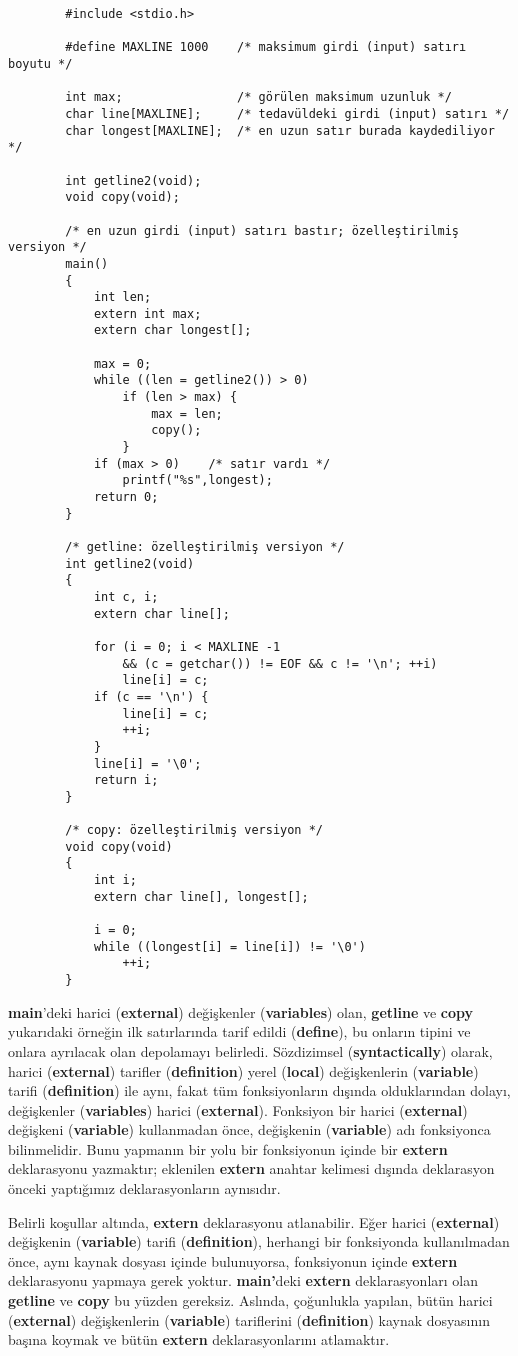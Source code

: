 \documentclass[a4paper,12pt,oneside]{book}
\begin{document}
\begin{lstlisting}
		#include <stdio.h>

		#define MAXLINE 1000	/* maksimum girdi (input) satırı boyutu */

		int max;				/* görülen maksimum uzunluk */
		char line[MAXLINE];     /* tedavüldeki girdi (input) satırı */
		char longest[MAXLINE];  /* en uzun satır burada kaydediliyor */

		int getline2(void);
		void copy(void);

		/* en uzun girdi (input) satırı bastır; özelleştirilmiş versiyon */
		main()
		{
			int len;
			extern int max;
			extern char longest[];

			max = 0;
			while ((len = getline2()) > 0)
				if (len > max) {
					max = len;
					copy();
				}
			if (max > 0)	/* satır vardı */
				printf("%s",longest);
			return 0;
		}

		/* getline: özelleştirilmiş versiyon */
		int getline2(void)
		{
			int c, i;
			extern char line[];

			for (i = 0; i < MAXLINE -1
				&& (c = getchar()) != EOF && c != '\n'; ++i)
				line[i] = c;
			if (c == '\n') {
				line[i] = c;
				++i;
			}
			line[i] = '\0';
			return i;
		}

		/* copy: özelleştirilmiş versiyon */
		void copy(void)
		{
			int i;
			extern char line[], longest[];

			i = 0;
			while ((longest[i] = line[i]) != '\0')
				++i;
		}
\end{lstlisting}
\par \textbf{main}'deki harici (\textbf{external}) değişkenler (\textbf{variables}) olan, \textbf{getline} ve \textbf{copy} yukarıdaki örneğin ilk satırlarında tarif edildi (\textbf{define}), bu onların tipini ve onlara ayrılacak olan depolamayı belirledi. Sözdizimsel (\textbf{syntactically}) olarak, harici (\textbf{external}) tarifler (\textbf{definition}) yerel (\textbf{local}) değişkenlerin (\textbf{variable}) tarifi (\textbf{definition}) ile aynı, fakat tüm fonksiyonların dışında olduklarından dolayı, değişkenler (\textbf{variables}) harici (\textbf{external}). Fonksiyon bir harici (\textbf{external}) değişkeni (\textbf{variable}) kullanmadan önce, değişkenin (\textbf{variable}) adı fonksiyonca bilinmelidir. Bunu yapmanın bir yolu bir fonksiyonun içinde bir \textbf{extern} deklarasyonu yazmaktır; eklenilen \textbf{extern} anahtar kelimesi dışında deklarasyon önceki yaptığımız deklarasyonların aynısıdır.
\par Belirli koşullar altında, \textbf{extern} deklarasyonu atlanabilir. Eğer harici (\textbf{external}) değişkenin (\textbf{variable}) tarifi (\textbf{definition}), herhangi bir fonksiyonda kullanılmadan önce, aynı kaynak dosyası içinde bulunuyorsa, fonksiyonun içinde \textbf{extern} deklarasyonu yapmaya gerek yoktur. \textbf{main'}deki \textbf{extern} deklarasyonları olan \textbf{getline} ve \textbf{copy} bu yüzden gereksiz. Aslında, çoğunlukla yapılan, bütün harici (\textbf{external}) değişkenlerin (\textbf{variable}) tariflerini (\textbf{definition}) kaynak dosyasının başına koymak ve bütün \textbf{extern} deklarasyonlarını atlamaktır.
\end{document}
